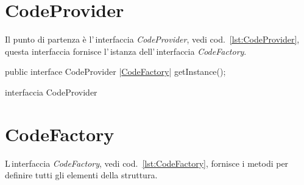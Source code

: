 \documentclass[a4paper,10pt]{report}
\newif\ifesource
\newenvironment{elisting}[1][H]
  {\captionsetup{aboveskip=0pt}\begin{listing}[#1]}
  {\end{listing}%
}
\begin{document}
\section{CodeProvider}
Il punto di partenza è l'\,interfaccia \textsl{CodeProvider}, vedi 
cod.~\ref{lst:CodeProvider}, questa interfaccia fornisce l'\,istanza 
dell'\,in\-ter\-fac\-cia \textsl{CodeFactory}.

\ifesource
\begin{figure*}[!htb]
\begin{lstlisting}[language=java, caption=interfaccia CodeProvider, 
label=lst:CodeProviderv]
public interface CodeProvider {
     (*\hyperref[lst:CodeFactory]{CodeFactory}*) getInstance();
}
\end{lstlisting}
\end{figure*}
\else
\begin{elisting}[!htb]
\begin{javacode}
public interface CodeProvider {
     |\hyperref[lst:CodeFactory]{CodeFactory}| getInstance();
}
\end{javacode}
\caption{interfaccia CodeProvider}\label{lst:CodeProvider}
\end{elisting}
\fi


\section{CodeFactory}
L\,interfaccia \textsl{CodeFactory}, vedi cod.~\ref{lst:CodeFactory}, fornisce i 
metodi per definire tutti gli elementi della struttura.
\end{document}
